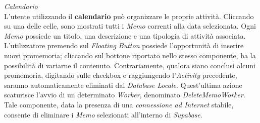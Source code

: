 \documentclass{article}
\begin{document}
    \textit{Calendario} \vspace*{7pt}\\
    L'utente utilizzando il \textbf{calendario} può organizzare le proprie attività. Cliccando su una delle celle, sono mostrati tutti i \textit{Memo} correnti alla data selezionata.
    Ogni \textit{Memo} possiede un titolo, una descrizione e una tipologia di attività associata. L'utilizzatore premendo sul \textit{Floating Button} possiede l'opportunità di inserire nuovi promemoria; cliccando sul bottone riportato nello stesso componente, ha la possibilità di variarne il contenuto. Contrariamente, qualora siano conclusi alcuni
    promemoria, digitando sulle checkbox e raggiungendo l'\textit{Activity} precedente, saranno automaticamente eliminati dal \textit{Database Locale}.
    Quest'ultima azione scaturisce l'avvio di un determinato \textit{Worker}, denominato \textit{DeleteMemoWorker}. Tale componente, data la presenza di una \textit{connessione ad Internet} stabile, consente di eliminare i \textit{Memo} selezionati all'interno di \textit{Supabase}.
    \begin{center}
        \begin{figure}[H]
            \centering
        \end{figure}
    \end{center}
\end{document}
